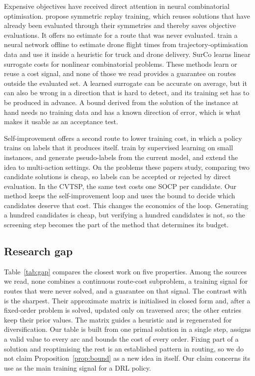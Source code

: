 \documentclass[preprint,12pt,authoryear]{elsarticle}
\begin{document}
Expensive objectives have received direct attention in neural combinatorial optimisation. \citet{kim2024} propose symmetric replay training, which reuses solutions that have already been evaluated through their symmetries and thereby saves objective evaluations. It offers no estimate for a route that was never evaluated. \citet{sun2026} train a neural network offline to estimate drone flight times from trajectory-optimisation data and use it inside a heuristic for truck and drone delivery. SurCo \citep{ferber2023} learns linear surrogate costs for nonlinear combinatorial problems. These methods learn or reuse a cost signal, and none of those we read provides a guarantee on routes outside the evaluated set. A learned surrogate can be accurate on average, but it can also be wrong in a direction that is hard to detect, and its training set has to be produced in advance. A bound derived from the solution of the instance at hand needs no training data and has a known direction of error, which is what makes it usable as an acceptance test.

Self-improvement offers a second route to lower training cost, in which a policy trains on labels that it produces itself. \citet{luo2023} train by supervised learning on small instances, \citet{pirnay2024} and \citet{luo2024} generate pseudo-labels from the current model, and \citet{luttmann2025} extend the idea to multi-action settings. On the problems these papers study, comparing two candidate solutions is cheap, so labels can be accepted or rejected by direct evaluation. In the CVTSP, the same test costs one SOCP per candidate. Our method keeps the self-improvement loop and uses the bound to decide which candidates deserve that cost. This changes the economics of the loop. Generating a hundred candidates is cheap, but verifying a hundred candidates is not, so the screening step becomes the part of the method that determines its budget.

\subsection{Research gap}
\label{sec:gap}

Table~\ref{tab:gap} compares the closest work on five properties. Among the sources we read, none combines a continuous route-cost subproblem, a training signal for routes that were never solved, and a guarantee on that signal. The contrast with \citet{li2025} is the sharpest. Their approximate matrix is initialised in closed form and, after a fixed-order problem is solved, updated only on traversed arcs; the other entries keep their prior values. The matrix guides a heuristic and is regenerated for diversification. Our table is built from one primal solution in a single step, assigns a valid value to every arc and bounds the cost of every order. Fixing part of a solution and reoptimising the rest is an established pattern in routing, so we do not claim Proposition~\ref{prop:bound} as a new idea in itself. Our claim concerns its use as the main training signal for a DRL policy.
\end{document}
